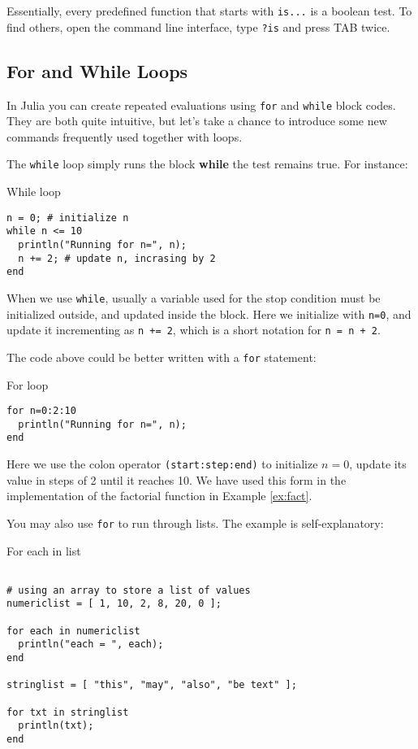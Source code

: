 Essentially, every predefined function that starts with \texttt{is...} is a boolean test. To find others, open the command line interface, type \texttt{?is} and press TAB twice.

\subsection{For and While Loops}

In Julia you can create repeated evaluations using \texttt{for} and \texttt{while} block codes. They are both quite intuitive, but let's take a chance to introduce some new commands frequently used together with loops.

The \texttt{while} loop simply runs the block \textbf{while} the test remains true. For instance:

\begin{example}{While loop}
\label{ex:while}
\begin{verbatim}
n = 0; # initialize n
while n <= 10
  println("Running for n=", n);
  n += 2; # update n, incrasing by 2
end
\end{verbatim}
\end{example}

When we use \texttt{while}, usually a variable used for the stop condition must be initialized outside, and updated inside the block. Here we initialize with \texttt{n=0}, and update it incrementing as \texttt{n += 2}, which is a short notation for \texttt{n = n + 2}.

The code above could be better written with a \texttt{for} statement:

\begin{example}{For loop}
\label{ex:for}
\begin{verbatim}
for n=0:2:10
  println("Running for n=", n);
end
\end{verbatim}
\end{example}

Here we use the colon operator \texttt{(start:step:end)} to initialize $n=0$, update its value in steps of 2 until it reaches 10. We have used this form in the implementation of the factorial function in Example \ref{ex:fact}.

You may also use \texttt{for} to run through lists. The example is self-explanatory:

\begin{example}{For each in list}
\label{ex:foreach}
\begin{verbatim}

# using an array to store a list of values
numericlist = [ 1, 10, 2, 8, 20, 0 ]; 

for each in numericlist
  println("each = ", each);
end

stringlist = [ "this", "may", "also", "be text" ];

for txt in stringlist
  println(txt);
end

\end{verbatim}
\end{example}

